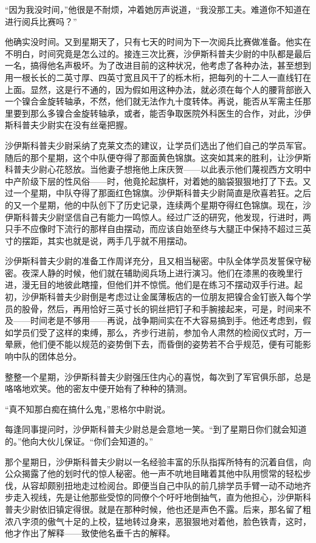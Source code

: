     “因为我没时间，”他很是不耐烦，冲着她厉声说道，“我没那工夫。难道你不知道在进行阅兵比赛吗？”

    他确实没时间。又到星期天了，只有七天的时间为下一次阅兵比赛做准备。他实在不明白，时间究竟是怎么过的。接连三次比赛，沙伊斯科普夫少尉的中队都是最后一名，搞得他名声极坏。为了改进目前的这种状况，他考虑了各种办法，甚至想到用一根长长的二英寸厚、四英寸宽且风干了的栎木桁，把每列的十二人一直线钉在上面。显然，这是行不通的，因为假如用这种办法，就必须在每个人的腰背部嵌入一个镍合金旋转轴承，不然，他们就无法作九十度转体。再说，能否从军需主任那里要到那么多镍合金旋转轴承，或者，能否争取医院外科医生的合作，对此，沙伊斯科普夫少尉实在没有丝毫把握。

    沙伊斯科普夫少尉采纳了克莱文杰的建议，让学员们选出了他们自己的学员军官。随后的那个星期，这个中队便夺得了那面黄色锦旗。这突如其来的胜利，让沙伊斯科普夫少尉心花怒放。当他妻子想拖他上床庆贺——以此表示他们蔑视西方文明中中产阶级下层的性风俗——时，他竟抡起旗杆，对着她的脑袋狠狠地打了下去。又过一个星期，中队夺得了那面红色锦旗。沙伊斯科普夫少尉简直是欣喜若狂。之后的又一个星期，他的中队创下了历史记录，连续两个星期夺得红色锦旗。现在，沙伊斯科普夫少尉坚信自己有能力一鸣惊人。经过广泛的研究，他发现，行进时，两只手不应像时下流行的那样自由摆动，而应该自始至终与大腿正中保持不超过三英寸的摆距，其实也就是说，两手几乎就不用摆动。
 


    沙伊斯科普夫少尉的准备工作周详充分，且又相当秘密。中队全体学员发誓保守秘密。夜深人静的时候，他们就在辅助阅兵场上进行演习。他们在漆黑的夜晚里行进，漫无目的地彼此瞎撞，但他们并不惊慌。他们是在练习不摆动双手行进。起初，沙伊斯科普夫少尉倒是考虑过让金属薄板店的一位朋友把镍合金钉嵌入每个学员的股骨，然后，再用恰好三英寸长的铜丝把钉子和手腕接起来，可是，时间来不及——时间老是不够用——再说，战争期间实在不大容易搞到手。他还考虑到，假如学员们受了这样的束缚，那么，齐步行进前，参加令人肃然的检阅仪式时，万一晕厥，他们便不能以规范的姿势倒下去，而昏倒的姿势若不合乎规范，便有可能影响中队的团体总分。

    整整一个星期，沙伊斯科普夫少尉强压住内心的喜悦，每次到了军官俱乐部，总是咯咯地欢笑。他的密友中便开始有了种种的猜测。

    “真不知那白痴在搞什么鬼，”恩格尔中尉说。

    每逢同事提问时，沙伊斯科普夫少尉总是会意地一笑。“到了星期日你们就会知道的。”他向大伙儿保证。“你们会知道的。”

    那个星期日，沙伊斯科普夫少尉以一名经验丰富的乐队指挥所特有的沉着自信，向公众揭露了他的划时代的惊人秘密。他一声不吭地目睹着其他中队用惯常的轻松步伐，从容却颇别扭地走过检阅台。即便当自己中队的前几排学员手臂一动不动地齐步走入视线，先是让他那些受惊的同僚个个吁吁地倒抽气，直为他担心，沙伊斯科普夫少尉依旧镇定得很。就是在那种时候，他也还是声色不露。后来，那名留了粗浓八字须的傲气十足的上校，猛地转过身来，恶狠狠地对着他，脸色铁青，这时，他才作出了解释——致使他名垂千古的解释。

